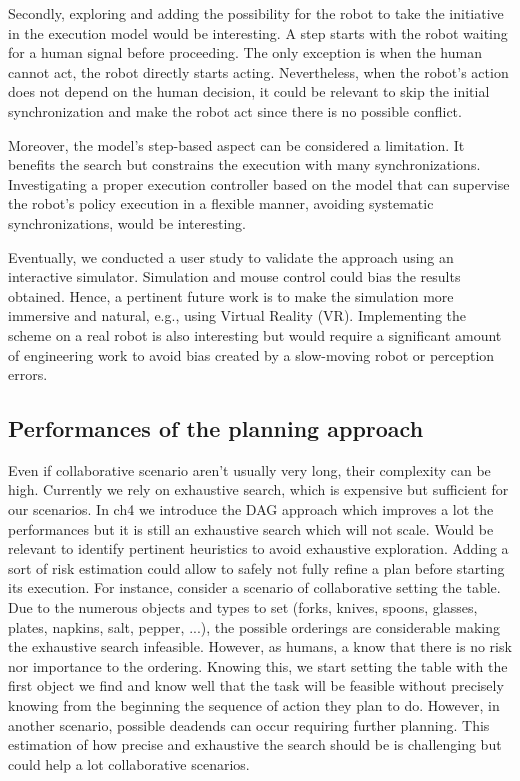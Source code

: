 Secondly, exploring and adding the possibility for the robot to take the initiative in the execution model would be interesting. A step starts with the robot waiting for a human signal before proceeding. The only exception is when the human cannot act, the robot directly starts acting. Nevertheless, when the robot's action does not depend on the human decision, it could be relevant to skip the initial synchronization and make the robot act since there is no possible conflict. 

Moreover, the model's step-based aspect can be considered a limitation. It benefits the search but constrains the execution with many synchronizations. Investigating a proper execution controller based on the model that can supervise the robot's policy execution in a flexible manner, avoiding systematic synchronizations, would be interesting.

Eventually, we conducted a user study to validate the approach using an interactive simulator. Simulation and mouse control could bias the results obtained. Hence, a pertinent future work is to make the simulation more immersive and natural, e.g., using Virtual Reality (VR). Implementing the scheme on a real robot is also interesting but would require a significant amount of engineering work to avoid bias created by a slow-moving robot or perception errors. 

\subsection*{Performances of the planning approach}

Even if collaborative scenario aren't usually very long, their complexity can be high. 
Currently we rely on exhaustive search, which is expensive but sufficient for our scenarios. In ch4 we introduce the DAG approach which improves a lot the performances but it is still an exhaustive search which will not scale. 
Would be relevant to identify pertinent heuristics to avoid exhaustive exploration. Adding a sort of risk estimation could allow to safely not fully refine a plan before starting its execution. For instance, consider a scenario of collaborative setting the table. Due to the numerous objects and types to set (forks, knives, spoons, glasses, plates, napkins, salt, pepper, ...), the possible orderings are considerable making the exhaustive search infeasible. However, as humans, a know that there is no risk nor importance to the ordering. Knowing this, we start setting the table with the first object we find and know well that the task will be feasible without precisely knowing from the beginning the sequence of action they plan to do. However, in another scenario, possible deadends can occur requiring further planning. This estimation of how precise and exhaustive the search should be is challenging but could help a lot collaborative scenarios.

